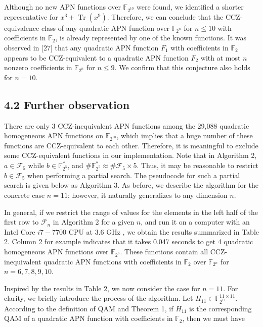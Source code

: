 \documentclass[10pt]{article}
\begin{document}
Although no new APN functions over $\mathbb{F}_{2^{10}}$ were found, we identified a shorter representative for $x^{3}+\operatorname{Tr}\left(x^{9}\right)$. Therefore, we can conclude that the CCZ-equivalence class of any quadratic APN function over $\mathbb{F}_{2^{n}}$ for $n \leq 10$ with coefficients in $\mathbb{F}_{2}$, is already represented by one of the known functions. It was observed in [27] that any quadratic APN function $F_{1}$ with coefficients in $\mathbb{F}_{2}$ appears to be CCZ-equivalent to a quadratic APN function $F_{2}$ with at most $n$ nonzero coefficients in $\mathbb{F}_{2^{n}}$ for $n \leq 9$. We confirm that this conjecture also holds for $n=10$.

\subsection*{4.2 Further observation}
There are only 3 CCZ-inequivalent APN functions among the 29,088 quadratic homogeneous APN functions on $\mathbb{F}_{2^{10}}$, which implies that a huge number of these functions are CCZ-equivalent to each other. Therefore, it is meaningful to exclude some CCZ-equivalent functions in our implementation. Note that in Algorithm 2, $a \in \mathcal{F}_{5}$ while $b \in \mathbb{F}_{2^{5}}^{*}$, and $\# \mathbb{F}_{2^{5}}^{*} \approx \# \mathcal{F}_{5} \times 5$. Thus, it may be reasonable to restrict $b \in \mathcal{F}_{5}$ when performing a partial search. The pseudocode for such a partial search is given below as Algorithm 3. As before, we describe the algorithm for the concrete case $n=11$; however, it naturally generalizes to any dimension $n$.

In general, if we restrict the range of values for the elements in the left half of the first row to $\mathcal{F}_{n}$ in Algorithm 2 for a given $n$, and run it on a computer with an Intel Core $i 7-7700$ CPU at 3.6 GHz , we obtain the results summarized in Table 2. Column 2 for example indicates that it takes 0.047 seconds to get 4 quadratic homogeneous APN functions over $\mathbb{F}_{2^{6}}$. These functions contain all CCZ-inequivalent quadratic APN functions with coefficients in $\mathbb{F}_{2}$ over $\mathbb{F}_{2^{n}}$ for $n=6,7,8,9,10$.

Inspired by the results in Table 2, we now consider the case for $n=11$. For clarity, we briefly introduce the process of the algorithm. Let $H_{11} \in \mathbb{F}_{2^{11}}^{11 \times 11}$. According to the definition of QAM and Theorem 1, if $H_{11}$ is the corresponding QAM of a quadratic APN function with coefficients in $\mathbb{F}_{2}$, then we must have
\end{document}
